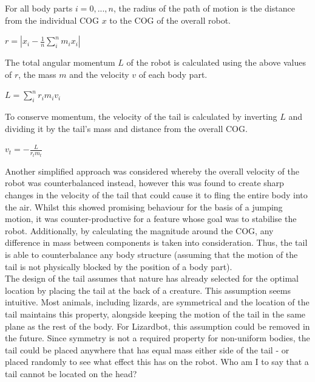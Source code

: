\documentclass{article}
\begin{document}
For all body parts $i = 0, ..., n$, the radius of the path of motion is the distance from the individual COG $x$ to the COG of the overall robot.
\begin{center}
\begin{Large}
$r = |x_{i} - \frac{1}{n}\sum_{i}^{n}m_{i}x_{i}|$
\end{Large}
\end{center}

The total angular momentum $L$ of the robot is calculated using the above values of $r$, the mass $m$ and the velocity $v$ of each body part. 
\begin{center}
\begin{Large}
$L = \sum^{n}_{i} r_{i}m_{i}v_{i}$
\end{Large}
\end{center}

To conserve momentum, the velocity of the tail is calculated by inverting $L$ and dividing it by the tail's mass and distance from the overall COG.
\begin{center}
\begin{Large}
$v_{t} = - \frac{L}{r_{t}m_{t}}$\\
\end{Large}
\end{center}

Another simplified approach was considered whereby the overall velocity of the robot was counterbalanced instead, however this was found to create sharp changes in the velocity of the tail that could cause it to fling the entire body into the air. Whilst this showed promising behaviour for the basis of a jumping motion, it was counter-productive for a feature whose goal was to stabilise the robot. Additionally, by calculating the magnitude around the COG, any difference in mass between components is taken into consideration. Thus, the tail is able to counterbalance any body structure (assuming that the motion of the tail is not physically blocked by the position of a body part).\\

The design of the tail assumes that nature has already selected for the optimal location by placing the tail at the back of a creature. This assumption seems intuitive. Most animals, including lizards, are symmetrical and the location of the tail maintains this property, alongside keeping the motion of the tail in the same plane as the rest of the body. For Lizardbot, this assumption could be removed in the future. Since symmetry is not a required property for non-uniform bodies, the tail could be placed anywhere that has equal mass either side of the tail - or placed randomly to see what effect this has on the robot. Who am I to say that a tail cannot be located on the head?
\end{document}
